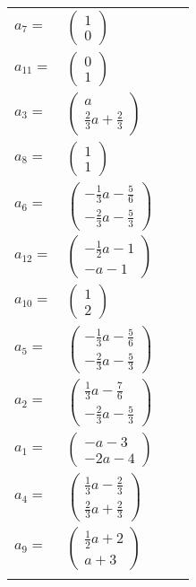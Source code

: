 \documentclass[1p]{elsarticle_modified}
\theoremstyle{definition}
\begin{document}
\begin{tabular}{m{7pt} m{180pt} m{7pt} m{180pt} }
\flushright $a_{7}=$&$\begin{pmatrix}1\\0\end{pmatrix}$ \\
\flushright $a_{11}=$&$\begin{pmatrix}0\\1\end{pmatrix}$ \\
\flushright $a_{3}=$&$\begin{pmatrix}a\\\frac{2}{3} a+\frac{2}{3}\end{pmatrix}$ \\
\flushright $a_{8}=$&$\begin{pmatrix}1\\1\end{pmatrix}$ \\
\flushright $a_{6}=$&$\begin{pmatrix}-\frac{1}{3} a-\frac{5}{6}\\-\frac{2}{3} a-\frac{5}{3}\end{pmatrix}$ \\
\flushright $a_{12}=$&$\begin{pmatrix}-\frac{1}{2} a-1\\- a-1\end{pmatrix}$ \\
\flushright $a_{10}=$&$\begin{pmatrix}1\\2\end{pmatrix}$ \\
\flushright $a_{5}=$&$\begin{pmatrix}-\frac{1}{3} a-\frac{5}{6}\\-\frac{2}{3} a-\frac{5}{3}\end{pmatrix}$ \\
\flushright $a_{2}=$&$\begin{pmatrix}\frac{1}{3} a-\frac{7}{6}\\-\frac{2}{3} a-\frac{5}{3}\end{pmatrix}$ \\
\flushright $a_{1}=$&$\begin{pmatrix}- a-3\\-2 a-4\end{pmatrix}$ \\
\flushright $a_{4}=$&$\begin{pmatrix}\frac{1}{3} a-\frac{2}{3}\\\frac{2}{3} a+\frac{2}{3}\end{pmatrix}$ \\
\flushright $a_{9}=$&$\begin{pmatrix}\frac{1}{2} a+2\\a+3\end{pmatrix}$\\&\end{tabular}
\end{document}
